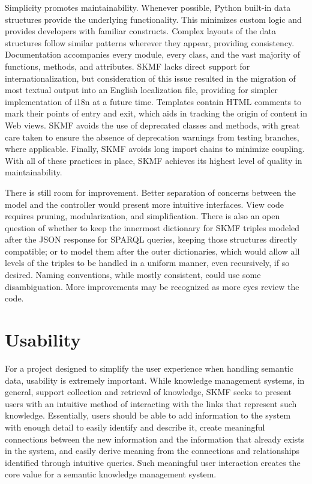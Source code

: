 Simplicity promotes maintainability. Whenever possible, Python built-in data structures provide the underlying functionality. This minimizes custom logic and provides developers with familiar constructs. Complex layouts of the data structures follow similar patterns wherever they appear, providing consistency. Documentation accompanies every module, every class, and the vast majority of functions, methods, and attributes. SKMF lacks direct support for internationalization, but consideration of this issue resulted in the migration of most textual output into an English localization file, providing for simpler implementation of i18n at a future time. Templates contain HTML comments to mark their points of entry and exit, which aids in tracking the origin of content in Web views. SKMF avoids the use of deprecated classes and methods, with great care taken to ensure the absence of deprecation warnings from testing branches, where applicable. Finally, SKMF avoids long import chains to minimize coupling. With all of these practices in place, SKMF achieves its highest level of quality in maintainability.

There is still room for improvement. Better separation of concerns between the model and the controller would present more intuitive interfaces. View code requires pruning, modularization, and simplification. There is also an open question of whether to keep the innermost dictionary for SKMF triples modeled after the JSON response for SPARQL queries, keeping those structures directly compatible; or to model them after the outer dictionaries, which would allow all levels of the triples to be handled in a uniform manner, even recursively, if so desired. Naming conventions, while mostly consistent, could use some disambiguation. More improvements may be recognized as more eyes review the code.


\section{Usability}
\label{result:usability}

For a project designed to simplify the user experience when handling semantic data, usability is extremely important. While knowledge management systems, in general, support collection and retrieval of knowledge, SKMF seeks to present users with an intuitive method of interacting with the links that represent such knowledge. Essentially, users should be able to add information to the system with enough detail to easily identify and describe it, create meaningful connections between the new information and the information that already exists in the system, and easily derive meaning from the connections and relationships identified through intuitive queries. Such meaningful user interaction creates the core value for a semantic knowledge management system.

